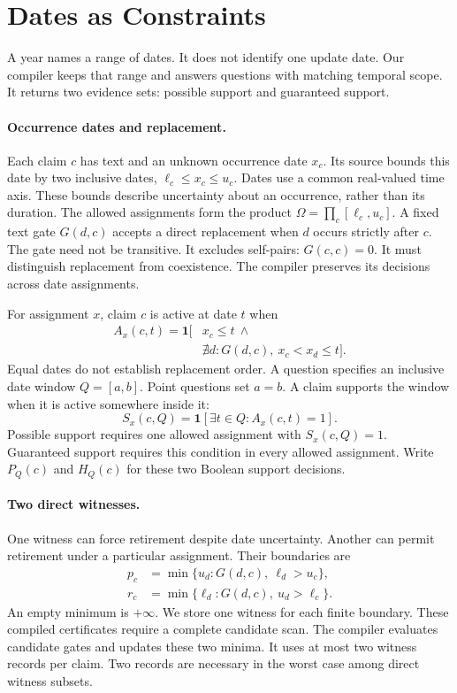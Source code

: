 \section{Dates as Constraints}
\label{sec:theory}

A year names a range of dates.
It does not identify one update date.
Our compiler keeps that range and answers questions with matching temporal scope.
It returns two evidence sets: possible support and guaranteed support.

\paragraph{Occurrence dates and replacement.}
Each claim $c$ has text and an unknown occurrence date $x_c$.
Its source bounds this date by two inclusive dates, $\ell_c\leq x_c\leq u_c$.
Dates use a common real-valued time axis.
These bounds describe uncertainty about an occurrence, rather than its duration.
The allowed assignments form the product
$\Omega=\prod_c[\ell_c,u_c]$.
A fixed text gate $G(d,c)$ accepts a direct replacement when $d$ occurs strictly after $c$.
The gate need not be transitive.
It excludes self-pairs: $G(c,c)=0$.
It must distinguish replacement from coexistence.
The compiler preserves its decisions across date assignments.

For assignment $x$, claim $c$ is active at date $t$ when
\begin{equation}
\begin{split}
 A_x(c,t)=\mathbf{1}[&x_c\leq t\ \land\\
 &\nexists d:G(d,c),\ x_c<x_d\leq t].
\end{split}
\label{eq:uncertain-active}
\end{equation}
Equal dates do not establish replacement order.
A question specifies an inclusive date window $Q=[a,b]$.
Point questions set $a=b$.
A claim supports the window when it is active somewhere inside it:
\begin{equation}
 S_x(c,Q)=\mathbf{1}[\exists t\in Q:A_x(c,t)=1].
\end{equation}
Possible support requires one allowed assignment with $S_x(c,Q)=1$.
Guaranteed support requires this condition in every allowed assignment.
Write $P_Q(c)$ and $H_Q(c)$ for these two Boolean support decisions.

\paragraph{Two direct witnesses.}
One witness can force retirement despite date uncertainty.
Another can permit retirement under a particular assignment.
Their boundaries are
\begin{align}
 p_c&=\min\{u_d:G(d,c),\ \ell_d>u_c\},\label{eq:possible-boundary}\\
 r_c&=\min\{\ell_d:G(d,c),\ u_d>\ell_c\}.\label{eq:certain-boundary}
\end{align}
An empty minimum is $+\infty$.
We store one witness for each finite boundary.
These compiled certificates require a complete candidate scan.
The compiler evaluates candidate gates and updates these two minima.
It uses at most two witness records per claim.
Two records are necessary in the worst case among direct witness subsets.


